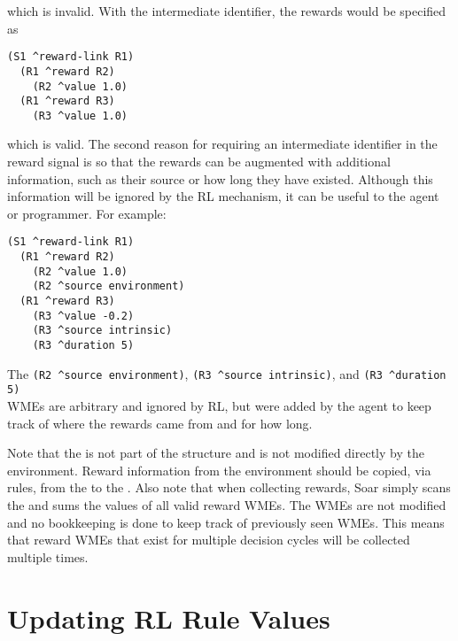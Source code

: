 which is invalid. With the intermediate identifier, the rewards would be specified as

\begin{verbatim}
(S1 ^reward-link R1)
  (R1 ^reward R2)
    (R2 ^value 1.0)
  (R1 ^reward R3)
    (R3 ^value 1.0)
\end{verbatim}

which is valid.
The second reason for requiring an intermediate identifier in the reward signal is so that the rewards can be augmented with additional information, such as their source or how long they have existed.
Although this information will be ignored by the RL mechanism, it can be useful to the agent or programmer.
For example:

\begin{verbatim}
(S1 ^reward-link R1)
  (R1 ^reward R2)
    (R2 ^value 1.0)
    (R2 ^source environment)
  (R1 ^reward R3)
    (R3 ^value -0.2)
    (R3 ^source intrinsic)
    (R3 ^duration 5)
\end{verbatim}  

The \verb=(R2 ^source environment)=, \verb=(R3 ^source intrinsic)=, and \verb=(R3 ^duration 5)= \\
WMEs are arbitrary and ignored by RL, but were added by the agent to keep 
track of where the rewards came from and for how long.

Note that the  is not part of the  structure and is not modified directly by the environment.
Reward information from the environment should be copied, via rules, from the  to the .
Also note that when collecting rewards, Soar simply scans the  and sums the values of all valid reward WMEs.
The WMEs are not modified and no bookkeeping is done to keep track of previously seen WMEs.
This means that reward WMEs that exist for multiple decision cycles will be collected multiple times.

\section{Updating RL Rule Values}
\label{RL-algo}

